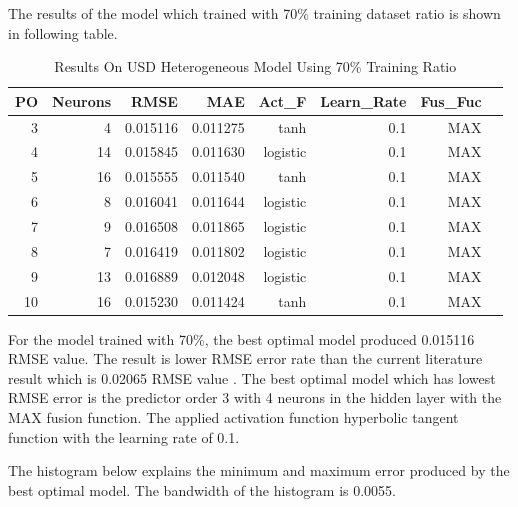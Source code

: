 {{{{{	
	The results of the model which trained with 70\% training dataset ratio is shown in following table.
	
	\setlength{\tabcolsep}{0.5em} %
	{\renewcommand{\arraystretch}{1.2}
		
		\begin{table}[ht]
			\centering
			\begin{tabular}{@{}rrrrrrrr@{}}
				\toprule
				\textbf{PO}&\textbf{Neurons}& \textbf{RMSE} & \textbf{MAE} & \textbf{Act\_F}  & \textbf{Learn\_Rate} &\textbf{ Fus\_Fuc}\\ 
				\midrule
				3 & 4 & 0.015116 & 0.011275 & tanh & 0.1 & MAX \\ 
				4 & 14 & 0.015845 & 0.011630 & logistic & 0.1 & MAX \\ 
				5 & 16 & 0.015555 & 0.011540 & tanh & 0.1 & MAX \\ 
				6 & 8 & 0.016041 & 0.011644 & logistic & 0.1 & MAX \\ 
				7 & 9 & 0.016508 & 0.011865 & logistic & 0.1 & MAX \\ 
				8 & 7 & 0.016419 & 0.011802 & logistic & 0.1 & MAX \\ 
				9 & 13 & 0.016889 & 0.012048 & logistic & 0.1 & MAX \\ 
				10 & 16 & 0.015230 & 0.011424 & tanh & 0.1 & MAX \\ 
				
				\hline
			\end{tabular}
			\hspace*{1cm}
			\caption{Results On USD Heterogeneous Model Using 70\% Training Ratio }
		\end{table}
		
		For the model trained with 70\%,  the best optimal model produced 0.015116 RMSE value. The result is lower RMSE error rate than the current literature result which is 0.02065 RMSE value \cite{chan:2010}. The best optimal model which has lowest RMSE error is the predictor order 3 with 4 neurons in the hidden layer with the MAX fusion function. The applied activation function hyperbolic tangent function with the learning rate of 0.1.
		
		The histogram below explains the minimum and maximum error produced by the best optimal model. The bandwidth of the histogram is 0.0055.
		
}}}}}}
